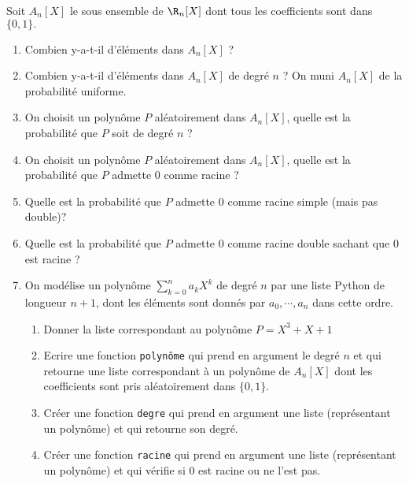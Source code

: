 


\begin{exercice}
Soit $A_n[X]$ le sous ensemble de $\R_n[X]$ dont tous les coefficients sont dans $\{0,1\}.$ 

\begin{enumerate}
\item Combien y-a-t-il d'éléments dans $A_n[X]$  ?
\item Combien y-a-t-il d'éléments dans $A_n[X]$ de degré $n$ ? 
On muni $A_n[X]$ de la probabilité uniforme. 
\item On choisit un polynôme $P$ aléatoirement dans $A_n[X]$, quelle est la probabilité que $P$ soit de degré $n$ ? 
\item On choisit un polynôme $P$ aléatoirement dans $A_n[X]$, quelle est la probabilité que $P$ admette 0 comme racine ? 
\item Quelle est la probabilité que $P$ admette $0$ comme racine simple (mais pas double)? 
\item Quelle est la probabilité que $P$ admette $0$ comme racine double sachant que $0$ est racine  ? 
\item On modélise un polynôme  $\sum_{k=0}^na_k X^k$ de degré $n$ par une liste Python de longueur $n+1$, dont les éléments sont donnés par $a_0,\cdots, a_n$ dans cette ordre. 
\begin{enumerate}
\item Donner la liste correspondant au polynôme  $P = X^3+X+1$
\item Ecrire une fonction \texttt{polynôme} qui prend en argument le degré $n$ et qui retourne une liste correspondant à un polynôme de $A_n[X]$ dont les coefficients sont pris aléatoirement dans $\{0,1\}$. 
\item Créer une fonction \texttt{degre} qui prend en argument une liste (représentant un polynôme) et qui retourne son degré. 
\item Créer une fonction \texttt{racine} qui prend en argument une liste (représentant un polynôme) et qui vérifie si $0$ est racine ou ne l'est pas. 
\end{enumerate}
\end{enumerate} 
\end{exercice}


